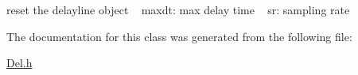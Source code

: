 reset the delayline object ~\newline
maxdt\+: max delay time ~\newline
sr\+: sampling rate 

The documentation for this class was generated from the following file\+:\begin{DoxyCompactItemize}
\item 
\hyperlink{_del_8h}{Del.\+h}\end{DoxyCompactItemize}
